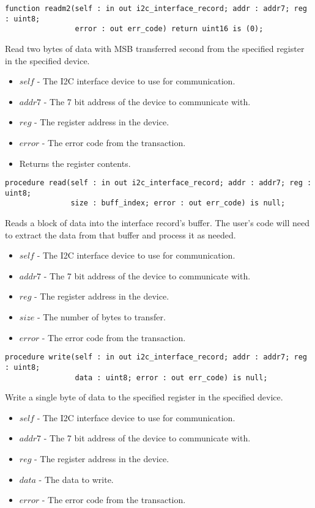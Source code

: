 \documentclass[10pt, openany]{book}
\begin{document}
\begin{lstlisting}
function readm2(self : in out i2c_interface_record; addr : addr7; reg : uint8;
                error : out err_code) return uint16 is (0);
\end{lstlisting}
Read two bytes of data with MSB transferred second from the specified register in the specified device.
\begin{itemize}
  \item $self$ - The I2C interface device to use for communication.
  \item $addr7$ - The 7 bit address of the device to communicate with.
  \item $reg$ - The register address in the device.
  \item $error$ - The error code from the transaction.
  \item Returns the register contents.
\end{itemize}

\begin{lstlisting}
procedure read(self : in out i2c_interface_record; addr : addr7; reg : uint8;
               size : buff_index; error : out err_code) is null;
\end{lstlisting}
Reads a block of data into the interface record's buffer.  The user's code will need to extract the data from that buffer and process it as needed.
\begin{itemize}
  \item $self$ - The I2C interface device to use for communication.
  \item $addr7$ - The 7 bit address of the device to communicate with.
  \item $reg$ - The register address in the device.
  \item $size$ - The number of bytes to transfer.
  \item $error$ - The error code from the transaction.
\end{itemize}

\begin{lstlisting}
procedure write(self : in out i2c_interface_record; addr : addr7; reg : uint8;
                data : uint8; error : out err_code) is null;
\end{lstlisting}
Write a single byte of data to the specified register in the specified device.
\begin{itemize}
  \item $self$ - The I2C interface device to use for communication.
  \item $addr7$ - The 7 bit address of the device to communicate with.
  \item $reg$ - The register address in the device.
  \item $data$ - The data to write.
  \item $error$ - The error code from the transaction.
\end{itemize}
\end{document}
